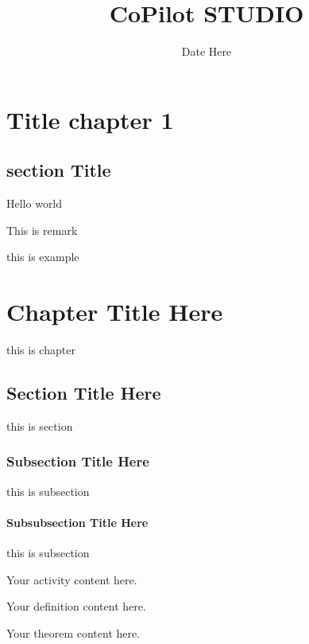 \documentclass[12pt,a4paper,violet]{bbe}
\title{CoPilot STUDIO}
\date{Date Here}
\begin{document}
\maketitle



\chapter{Title chapter 1}

\section{section Title}
 
\begin{definition}
    Hello world
\end{definition}
 
\begin{remark}
    This is remark
\end{remark}
 
\begin{example}
    this is example
\end{example}

\chapter{Chapter Title Here}
this is chapter
\section{Section Title Here}
this is section
\subsection{Subsection Title Here}
this is subsection
\subsubsection{Subsubsection Title Here}
this is subsection
\begin{activity}
Your activity content here.
\end{activity}

\begin{definition}
Your definition content here.
\end{definition}

\begin{theorem}
Your theorem content here.
\end{theorem}
\end{document}
